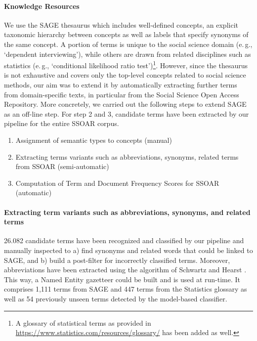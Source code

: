 \paragraph{Knowledge Resources}%
We use the SAGE thesaurus which includes well-defined concepts, an explicit taxonomic hierarchy between concepts as well as labels that specify synonyms of the same concept.
A portion of terms is unique to the social science domain (e.\,g.,  `dependent interviewing'), while others are drawn from related disciplines such as statistics (e.\,g., `conditional likelihood ratio test')\footnote{A glossary of statistical terms as provided in \url{https://www.statistics.com/resources/glossary/} has been added as well.}.
However, since the thesaurus is not exhaustive and covers only the top-level concepts related to social science methods, our aim was to extend it by automatically extracting further terms from domain-specific texts, in particular from the Social Science Open Access Repository.
More concretely, we carried out the following steps to extend SAGE as an off-line step. For step 2 and 3, candidate terms have been extracted by our pipeline for the entire SSOAR corpus. 
\begin{enumerate}
\item Assignment of semantic types to concepts (manual) 
\item Extracting terms variants such as abbreviations, synonyms, related terms from SSOAR (semi-automatic)
\item Computation of Term and Document Frequency Scores for SSOAR (automatic)
\end{enumerate}

\paragraph{Extracting term variants such as abbreviations, synonyms, and related terms}%
26.082 candidate terms have been recognized and classified by our pipeline and manually inspected to  
a) find synonyms and related words that could be linked to SAGE, and
b) build a post-filter for incorrectly classified terms. 
Moreover, abbreviations have been extracted using the algorithm of Schwartz and Hearst
\cite{SchwartzH03}.
This way, a Named Entity gazetteer could be built and is used at run-time. It comprises 1,111 terms from SAGE and 447 terms from the Statistics glossary as well as 54 previously unseen terms detected by the model-based classifier. 




